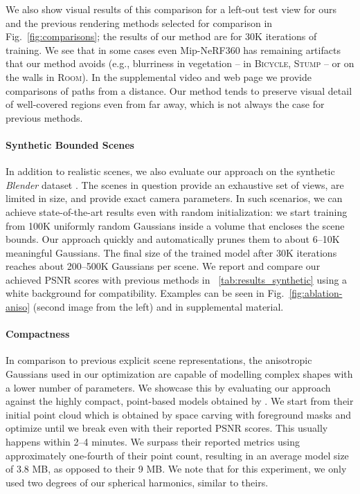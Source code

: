 We also show visual results of this comparison for a left-out test view for ours and the previous rendering methods selected for comparison in Fig.~\ref{fig:comparisons}; the results of our method are for 30K iterations of training. We see that in some cases even Mip-NeRF360 has remaining artifacts that our method avoids (e.g., blurriness in vegetation -- in \textsc{Bicycle, Stump} -- or on the walls in \textsc{Room}).
In the supplemental video and web page we provide comparisons of paths from a distance. Our method tends to preserve visual detail of well-covered regions even from far away, which is not always the case for previous methods.




\paragraph{Synthetic Bounded Scenes}
In addition to realistic scenes, we also evaluate our approach on the synthetic \emph{Blender} dataset \cite{mildenhall2020nerf}. The scenes in question provide an exhaustive set of views, are limited in size, and provide exact camera parameters. In such scenarios, we can achieve state-of-the-art results even with random initialization: we start training from 100K uniformly random Gaussians inside a volume that encloses the scene bounds. Our approach quickly and automatically prunes them to about 6--10K meaningful Gaussians. The final size of the trained model after 30K iterations reaches about 200--500K Gaussians per scene. We report and compare our achieved PSNR scores with previous methods in ~\ref{tab:results_synthetic} using a white background for compatibility. Examples can be seen in Fig.~\ref{fig:ablation-aniso} (second image from the left) and in supplemental material. 

\paragraph{Compactness}
In comparison to previous explicit scene representations, the anisotropic Gaussians used in our optimization are capable of modelling complex shapes with a lower number of parameters.
We showcase this by evaluating our approach against the highly compact, point-based models obtained by \cite{zhang2022}.
We start from their initial point cloud which is obtained by space carving with foreground masks %
and optimize until we break even with their reported PSNR scores. This usually happens within 2--4 minutes. We surpass their reported metrics using approximately one-fourth of their point count, resulting in an average model size of 3.8 MB, as opposed to their 9 MB. We note that for this experiment, we only used two degrees of our spherical harmonics, similar to theirs.


